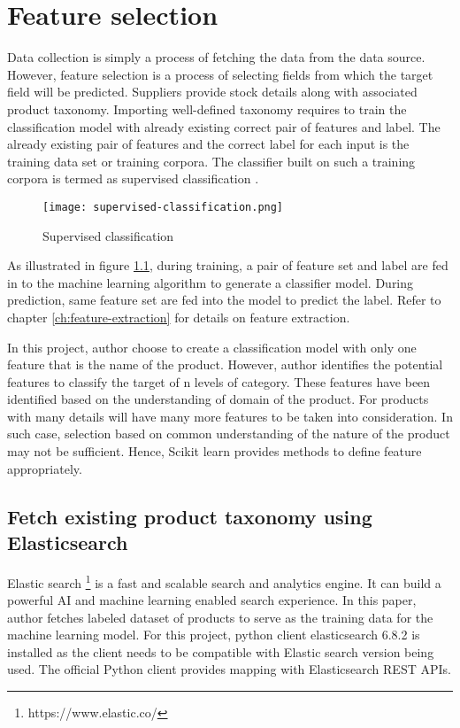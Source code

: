 \chapter{Feature selection}

Data collection is simply a process of fetching the data from the data source. However, feature selection is a process of selecting fields from which the target field will be predicted. Suppliers provide stock details along with associated product taxonomy. Importing well-defined taxonomy requires to train the classification model with already existing correct pair of features and label. The already existing pair of features and the correct label for each input is the training data set or training corpora. The classifier built on such a training corpora is termed as supervised classification \parencite{BirdKleinLoper09}.

\begin{figure}[H]
      \centering    
      \texttt{[image: supervised-classification.png]}
      \caption{Supervised classification \parencite{BirdKleinLoper09}}
      \label{fig:supervised-classification}
  \end{figure}

  As illustrated in figure \ref{fig:supervised-classification}, during training, a pair of feature set and label are fed in to the machine learning algorithm to generate a classifier model. During prediction, same feature set are fed into the model to predict the label. Refer to chapter \ref{ch:feature-extraction} for details on feature extraction.

In this project, author choose to create a classification model with only one feature that is the name of the product. However, author identifies the potential features to classify the target of n levels of category. These features have been identified based on the understanding of domain of the product. For products with many details will have many more features to be taken into consideration. In such case, selection based on common understanding of the nature of the product may not be sufficient. Hence, Scikit learn  \parencite{sklearn_api} provides methods to define feature appropriately. 


\section {Fetch existing product taxonomy using Elasticsearch}
Elastic search \footnote{https://www.elastic.co/} is a fast and scalable search and analytics engine. It can build a powerful AI and machine learning enabled search experience. In this paper, author fetches labeled dataset of products to serve as the training data for the machine learning model.
For this project, python client elasticsearch 6.8.2 is installed as the client needs to be compatible with Elastic search version being used. The official Python client provides mapping with Elasticsearch REST APIs.

